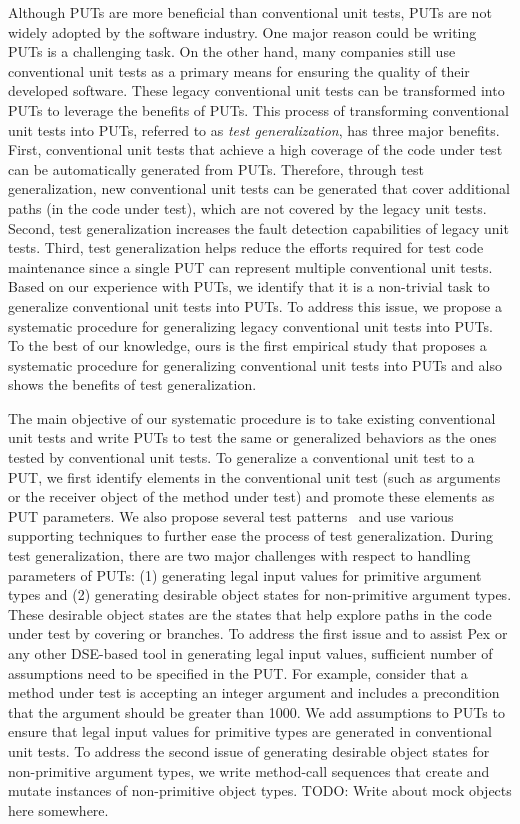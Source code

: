 Although PUTs are more beneficial than conventional unit tests, PUTs are not widely adopted by the software industry. One major reason could be writing PUTs is a challenging task. On the other hand, many companies still use conventional unit tests as a primary means for ensuring the quality of their developed software. These legacy conventional unit tests can be transformed into PUTs to leverage the benefits of PUTs. This process of transforming conventional unit tests into PUTs, referred to as \emph{test generalization}, has three major benefits. First, conventional unit tests that achieve a high coverage of the code under test can be automatically generated from PUTs. Therefore, through test generalization, new conventional unit tests can be generated that cover additional paths (in the code under test), which are not covered by the legacy unit tests. Second, test generalization increases the fault detection capabilities of legacy unit tests. Third, test generalization helps reduce the efforts required for test code maintenance since a single PUT can represent multiple conventional unit tests. Based on our experience with PUTs, we identify that it is a non-trivial task to generalize conventional unit tests into PUTs. To address this issue, we propose a systematic procedure for generalizing legacy conventional unit tests into PUTs. To the best of our knowledge, ours is the first empirical study that proposes a systematic procedure for generalizing conventional unit tests into PUTs and also shows the benefits of test generalization.

The main objective of our systematic procedure is to take existing conventional unit tests and write PUTs to test the same or generalized behaviors as the ones tested by  conventional unit tests. To generalize a conventional unit test to a PUT, we first identify elements in the conventional unit test (such as arguments or the receiver object of the method under test) and promote these elements as PUT parameters. We also propose several test patterns~\cite{halleux08:putpatterns} and use various supporting techniques to further ease the process of test generalization. During test generalization, there are two major challenges with respect to handling parameters of PUTs: (1) generating legal input values for primitive argument types and (2) generating desirable object states for non-primitive argument types. These desirable object states are the states that help explore paths in the code under test by covering  or  branches. To address the first issue and to assist Pex or any other DSE-based tool in generating legal input values,  sufficient number of assumptions need to be specified in the PUT. For example, consider that a method under test is accepting an integer argument and includes a precondition that the argument should be greater than 1000. We add assumptions to PUTs to ensure that legal input values for primitive types are generated in conventional unit tests. To address the second issue of generating desirable object states for non-primitive argument types, we write method-call sequences that create and mutate instances of non-primitive object types. TODO: Write about mock objects here somewhere.

